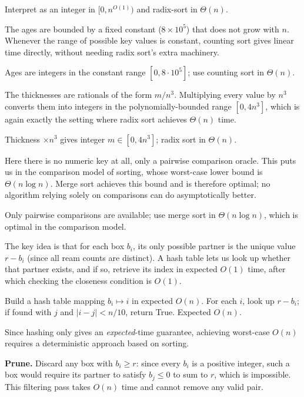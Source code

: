 \documentclass[12pt,twoside]{article}
\begin{document}
\begin{problems}
\begin{problemparts}
Interpret as an integer in $[0,n^{O(1)})$ and radix-sort in $\Theta(n)$.
 
\problempart %
The ages are bounded by a fixed constant ($8\times10^5$) that does not grow with $n$. Whenever the range of possible key values is constant, counting sort gives linear time directly, without needing radix sort's extra machinery.
 
Ages are integers in the constant range $[0,8\cdot10^5]$; use counting sort in $\Theta(n)$.
 
\problempart %
The thicknesses are rationals of the form $m/n^3$. Multiplying every value by $n^3$ converts them into integers in the polynomially-bounded range $[0,4n^3]$, which is again exactly the setting where radix sort achieves $\Theta(n)$ time.
 
Thickness $\times n^3$ gives integer $m\in[0,4n^3]$; radix sort in $\Theta(n)$.
 
\problempart %
Here there is no numeric key at all, only a pairwise comparison oracle. This puts us in the comparison model of sorting, whose worst-case lower bound is $\Theta(n\log n)$. Merge sort achieves this bound and is therefore optimal; no algorithm relying solely on comparisons can do asymptotically better.
 
Only pairwise comparisons are available; use merge sort in $\Theta(n\log n)$, which is optimal in the comparison model.
 
\end{problemparts}

\problem %

\begin{problemparts}
 
\problempart %
The key idea is that for each box $b_i$, its only possible partner is the unique value $r-b_i$ (since all ream counts are distinct). A hash table lets us look up whether that partner exists, and if so, retrieve its index in expected $O(1)$ time, after which checking the closeness condition is $O(1)$.
 
Build a hash table mapping $b_i \mapsto i$ in expected $O(n)$. For each $i$, look up $r-b_i$; if found with $j$ and $|i-j| < n/10$, return True. Expected $O(n)$.
 
\problempart %
Since hashing only gives an \emph{expected}-time guarantee, achieving worst-case $O(n)$ requires a deterministic approach based on sorting.

\textbf{Prune.} Discard any box with $b_i \ge r$: since every $b_i$ is a positive integer, such a box would require its partner to satisfy $b_j \le 0$ to sum to $r$, which is impossible. This filtering pass takes $O(n)$ time and cannot remove any valid pair.


\end{problemparts}
\end{problems}
\end{document}
